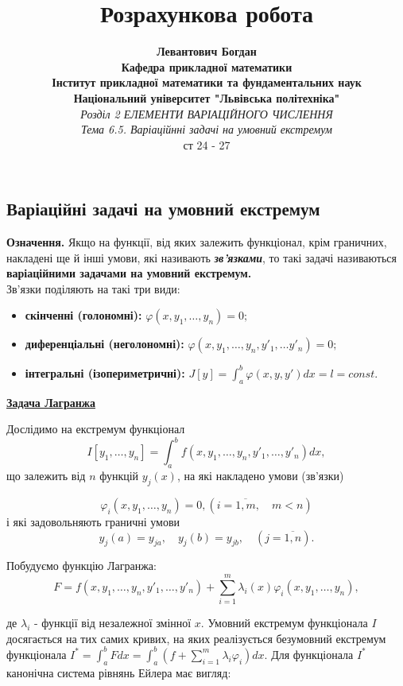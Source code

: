 \documentclass[12pt,a4paper]{article}
\title{Розрахункова робота}
\author{
 \textbf{Левантович Богдан}
 \\\textbf{Кафедра прикладної математики}
 \\\textbf{Інститут прикладної математики та фундаментальних наук}
 \\\textbf{Національний університет "Львівська політехніка"}
\\\emph{Розділ 2 ЕЛЕМЕНТИ ВАРІАЦІЙНОГО ЧИСЛЕННЯ}
\\\emph{Тема 6.5. Варіаційнні задачі на умовний екстремум}
 \\\textcolor[rgb]{0.00,1.00,0.25}{ст 24 - 27}     
}
\date{}
\begin{document}
\maketitle
	\newpage
	\subsection{Варіаційні задачі на умовний екстремум}

	\textbf{Означення.} Якщо на функції, від яких залежить функціонал, крім граничних, накладені ще й інші умови,
	які називають \textbf{\textit{зв’язками}}, то такі задачі називаються \textbf{варіаційними задачами на умовний екстремум.} \\
	Зв’язки поділяють на такі три види: 
	\begin{itemize}
		\item \textbf{скінченні (голономні):} $\varphi(x, y_1,\ldots, y_n) = 0;$

		\item \textbf{диференціальні (неголономні):}
			$\varphi(x, y_1, \ldots, y_n, y'_1, \ldots y'_n) = 0;$

		\item \textbf{інтегральні (ізопериметричні):} 
			$J[y] = \int_{a}^{b} \varphi(x, y, y')dx = l = const$.
	\end{itemize}

	\begin{center}
		\underline{\textbf{Задача Лагранжа}}
	\end{center}

	Дослідимо на екстремум функціонал
	\begin{equation}
		I[y_1, \ldots, y_n] = \int_{a}^{b} f(x, y_1, \ldots, y_n, y'_1, \ldots, y'_n)dx,
	\end{equation}
	що залежить від $n$ функцій $y_j(x)$, на які накладено умови (зв’язки)
	
	$$\varphi_i(x, y_1, \ldots, y_n) = 0, (i = \overline{1,m}, \quad m < n)$$
	і які задовольняють граничні умови
	$$y_j(a) = y_{ja}, \quad y_j(b) = y_{jb}, \quad (j=\overline{1,n}).$$
	
	Побудуємо функцію Лагранжа:
	\begin{equation}
		F = f(x, y_1, \ldots, y_n, y'_1, \ldots, y'_n) + 
		\sum_{i=1}^{m} \lambda_i(x) \varphi_i(x, y_1, \ldots, y_n),    			
	\end{equation}				      

	де $\lambda_i$ - функції від незалежної змінної $x$. Умовний екстремум функціонала $I$
	досягається на тих самих кривих, на яких реалізується безумовний екстремум функціонала
	$I^{*} = \int_{a}^{b} Fdx = \int_{a}^{b} \left(f + \sum_{i=1}^{m} \lambda_i \varphi_i \right)dx$.
	Для функціонала $I^{*}$ канонічна система рівнянь Ейлера має вигляд:
	
\end{document}

